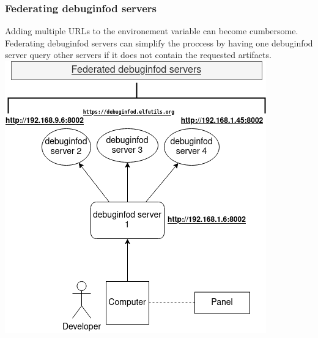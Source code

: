 \documentclass[12pt]{beamer}
\begin{document}
\begin{frame}[fragile]
   \frametitle{ Federating debuginfod servers}
   \fontsize{10pt}{10pt}\selectfont
   Adding multiple URLs to the environement variable can become cumbersome. Federating
   debuginfod servers can simplify the proccess by having one debuginfod server query 
   other servers if it does not contain the requested artifacts.
   \includegraphics[scale=.375]{federeated_servers.png}
\end{frame}
\end{document}
